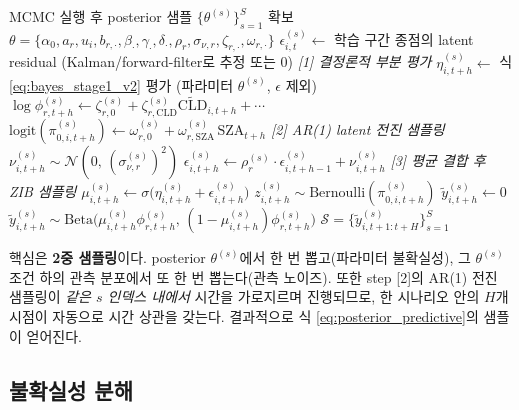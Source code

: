 \documentclass[11pt,a4paper]{article}
\begin{document}
\begin{algorithm}[H]
\caption{Posterior Predictive Scenario Sampling (AR(1) latent state 명시)}
\label{alg:scenario}
\begin{algorithmic}[1]
\State MCMC 실행 후 posterior 샘플 $\{\theta^{(s)}\}_{s=1}^{S}$ 확보
\State $\theta = \{\alpha_0, a_r, u_i, b_{r,\cdot}, \beta_\cdot, \gamma_\cdot, \delta_\cdot, \rho_r, \sigma_{\nu,r}, \zeta_{r,\cdot}, \omega_{r,\cdot}\}$
    \State $\epsilon^{(s)}_{i,t} \gets$ 학습 구간 종점의 latent residual (Kalman/forward-filter로 추정 또는 0)
        \State \emph{[1] 결정론적 부분 평가}
        \State $\eta^{(s)}_{i,t+h} \gets$ 식 \eqref{eq:bayes_stage1_v2} 평가 (파라미터 $\theta^{(s)}$, $\epsilon$ 제외)
        \State $\log\phi^{(s)}_{r,t+h} \gets \zeta^{(s)}_{r,0} + \zeta^{(s)}_{r,\mathrm{CLD}}\widetilde{\mathrm{CLD}}_{i,t+h} + \cdots$
        \State $\mathrm{logit}(\pi^{(s)}_{0,i,t+h}) \gets \omega^{(s)}_{r,0} + \omega^{(s)}_{r,\mathrm{SZA}}\,\mathrm{SZA}_{t+h}$
        \State \emph{[2] AR(1) latent 전진 샘플링}
        \State $\nu^{(s)}_{i,t+h} \sim \mathcal{N}(0,\,(\sigma^{(s)}_{\nu,r})^2)$
        \State $\epsilon^{(s)}_{i,t+h} \gets \rho^{(s)}_r \cdot \epsilon^{(s)}_{i,t+h-1} + \nu^{(s)}_{i,t+h}$
        \State \emph{[3] 평균 결합 후 ZIB 샘플링}
        \State $\mu^{(s)}_{i,t+h} \gets \sigma\bigl(\eta^{(s)}_{i,t+h} + \epsilon^{(s)}_{i,t+h}\bigr)$
        \State $z^{(s)}_{i,t+h} \sim \mathrm{Bernoulli}(\pi^{(s)}_{0,i,t+h})$
            \State $\tilde y^{(s)}_{i,t+h} \gets 0$
        \Else
            \State $\tilde y^{(s)}_{i,t+h} \sim \mathrm{Beta}\bigl(\mu^{(s)}_{i,t+h}\phi^{(s)}_{r,t+h},\,(1-\mu^{(s)}_{i,t+h})\phi^{(s)}_{r,t+h}\bigr)$
        \EndIf
    \EndFor
\EndFor
\State \Return $\mathcal{S} = \{\tilde y^{(s)}_{i,t+1:t+H}\}_{s=1}^{S}$ 
\end{algorithmic}
\end{algorithm}

핵심은 \textbf{2중 샘플링}이다. posterior $\theta^{(s)}$에서 한 번 뽑고(파라미터 불확실성), 그 $\theta^{(s)}$ 조건 하의 관측 분포에서 또 한 번 뽑는다(관측 노이즈). 또한 step [2]의 AR(1) 전진 샘플링이 \emph{같은 $s$ 인덱스 내에서} 시간을 가로지르며 진행되므로, 한 시나리오 안의 $H$개 시점이 자동으로 시간 상관을 갖는다. 결과적으로 식 \eqref{eq:posterior_predictive}의 샘플이 얻어진다.

\subsection{불확실성 분해}
\end{document}
